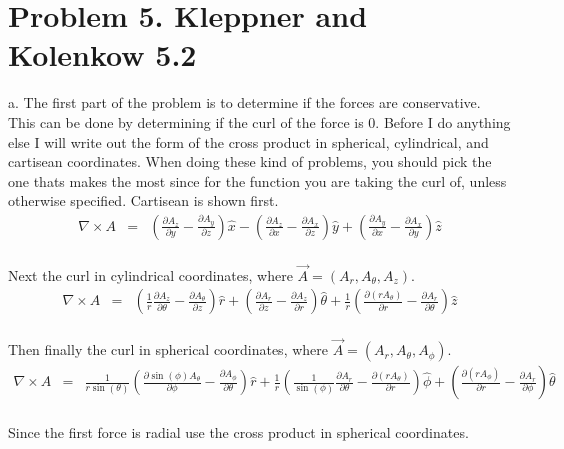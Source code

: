 \documentclass[11pt]{amsart}
\begin{document}
\section{Problem 5. Kleppner and Kolenkow 5.2}
a. The first part of the problem is to determine if the forces are conservative. This can be done by determining if the curl of the force is 0. Before I do anything else I will write out the form of the cross product in spherical, cylindrical, and cartisean coordinates. When doing these kind of problems, you should pick the one thats makes the most since for the function you are taking the curl of, unless otherwise specified. Cartisean is shown first. \\
\begin{eqnarray*}
\nabla \times A &=& 
 \left(\frac{\partial{A_{z}}}{\partial{y}}-\frac{\partial{A_{y}}}{\partial{z}}\right)\hat{x} 
-\left(\frac{\partial{A_{z}}}{\partial{x}}-\frac{\partial{A_{x}}}{\partial{z}}\right)\hat{y} 
+\left(\frac{\partial{A_{y}}}{\partial{x}}-\frac{\partial{A_{x}}}{\partial{y}}\right)\hat{z} 
\end{eqnarray*} \\
Next the curl in cylindrical coordinates, where $\vec{A}=(A_{r}, A_{\theta}, A_{z})$. \\
\begin{eqnarray*}
\nabla \times A &=& 
\left(\frac{1}{r}\frac{\partial{A_{z}}}{\partial{\theta}}-\frac{\partial{A_{\theta}}}{\partial{z}}\right)\hat{r}
+\left(\frac{\partial{A_{r}}}{\partial{z}}-\frac{\partial{A_{z}}}{\partial{r}}\right)\hat{\theta}
+\frac{1}{r}\left(\frac{\partial{(rA_{\theta})}}{\partial{r}}-\frac{\partial{A_r}}{\partial{\theta}}\right)\hat{z}
\end{eqnarray*} \\
Then finally the curl in spherical coordinates, where $\vec{A}=(A_{r}, A_{\theta}, A_{\phi})$. \\
\begin{eqnarray*}
\nabla \times A &=&
\frac{1}{r\sin(\theta)}\left(\frac{\partial{\sin(\phi)A_{\theta}}}{\partial{\phi}}-\frac{\partial{A_{\phi}}}{\partial{\theta}}\right)\hat{r}
+\frac{1}{r}\left(\frac{1}{\sin(\phi)}\frac{\partial{A_{r}}}{\partial{\theta}}-\frac{\partial{(rA_{\theta})}}{\partial{r}}\right)\hat{\phi}
+\left(\frac{\partial{(rA_{\phi})}}{\partial{r}}-\frac{\partial{A_{r}}}{\partial{\phi}}\right)\hat{\theta} 
\end{eqnarray*} \\
Since the first force is radial use the cross product in spherical coordinates. \\
\end{document}
